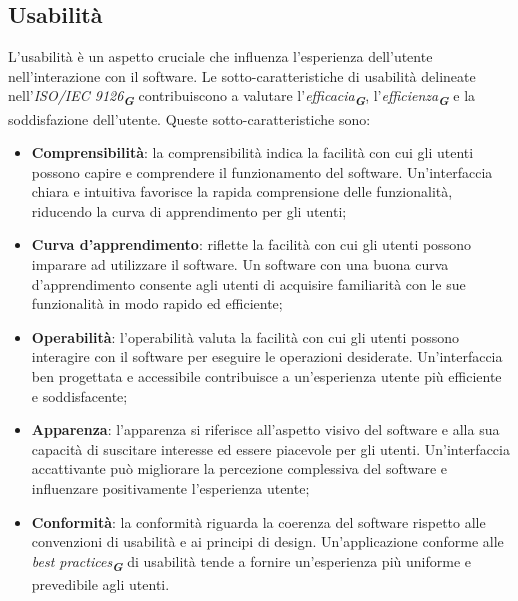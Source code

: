 \subsection{Usabilità}
L’usabilità è un aspetto cruciale che influenza l’esperienza dell’utente nell’interazione con il
software. Le sotto-caratteristiche di usabilità delineate nell’\emph{ISO/IEC 9126}\textsubscript{\textit{\textbf{G}}} contribuiscono a
valutare l’\emph{efficacia}\textsubscript{\textit{\textbf{G}}}, l’\emph{efficienza}\textsubscript{\textit{\textbf{G}}} e la soddisfazione dell’utente. 
Queste sotto-caratteristiche sono:
\begin{itemize}
    \item \textbf{Comprensibilità}: la comprensibilità indica la facilità con cui gli utenti possono capire
    e comprendere il funzionamento del software. Un’interfaccia chiara e intuitiva favorisce
    la rapida comprensione delle funzionalità, riducendo la curva di apprendimento per gli
    utenti;
    \item \textbf{Curva d’apprendimento}: riflette la facilità con cui gli utenti possono imparare ad
    utilizzare il software. Un software con una buona curva d’apprendimento consente agli
    utenti di acquisire familiarità con le sue funzionalità in modo rapido ed efficiente;
    \item \textbf{Operabilità}: l’operabilità valuta la facilità con cui gli utenti possono interagire
    con il software per eseguire le operazioni desiderate. Un’interfaccia ben progettata
    e accessibile contribuisce a un’esperienza utente più efficiente e soddisfacente;
    \item \textbf{Apparenza}: l’apparenza si riferisce all’aspetto visivo del software e alla sua capacità 
    di suscitare interesse ed essere piacevole per gli utenti. Un'interfaccia accattivante 
    può migliorare la percezione complessiva del software e influenzare positivamente l’esperienza utente;
    \item \textbf{Conformità}: la conformità riguarda la coerenza del software rispetto alle convenzioni
    di usabilità e ai principi di design. Un’applicazione conforme alle \emph{best practices}\textsubscript{\textit{\textbf{G}}} di
    usabilità tende a fornire un’esperienza più uniforme e prevedibile agli utenti.
\end{itemize}


